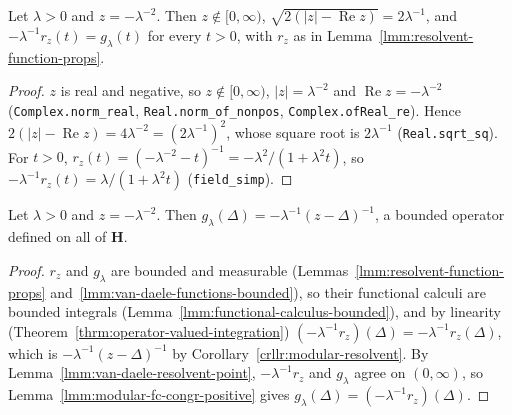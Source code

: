\begin{lemma}[Takesaki's Lemma at $z = -\lambda^{-2}$: Scalars]
    \label{lmm:van-daele-resolvent-point}
    \leanok
    Let $\lambda > 0$ and $z = -\lambda^{-2}$. Then $z \notin [0, \infty)$, $\sqrt{2(|z| - \operatorname{Re} z)} = 2\lambda^{-1}$, and $-\lambda^{-1}r_z(t) = g_\lambda(t)$ for every $t > 0$, with $r_z$ as in Lemma~\ref{lmm:resolvent-function-props}.
\end{lemma}
\begin{proof}
    \leanok
    $z$ is real and negative, so $z \notin [0, \infty)$, $|z| = \lambda^{-2}$ and $\operatorname{Re} z = -\lambda^{-2}$ (\texttt{Complex.norm\_real}, \texttt{Real.norm\_of\_nonpos}, \texttt{Complex.ofReal\_re}). Hence $2(|z| - \operatorname{Re} z) = 4\lambda^{-2} = (2\lambda^{-1})^2$, whose square root is $2\lambda^{-1}$ (\texttt{Real.sqrt\_sq}). For $t > 0$, $r_z(t) = (-\lambda^{-2} - t)^{-1} = -\lambda^2/(1 + \lambda^2t)$, so $-\lambda^{-1}r_z(t) = \lambda/(1 + \lambda^2 t)$ (\texttt{field\_simp}).
\end{proof}

\begin{lemma}
    \label{lmm:van-daele-g-resolvent}
    \leanok
    Let $\lambda > 0$ and $z = -\lambda^{-2}$. Then $g_\lambda(\Delta) = -\lambda^{-1}(z - \Delta)^{-1}$, a bounded operator defined on all of $\mathbf{H}$.
\end{lemma}
\begin{proof}
    \leanok
    $r_z$ and $g_\lambda$ are bounded and measurable (Lemmas~\ref{lmm:resolvent-function-props} and~\ref{lmm:van-daele-functions-bounded}), so their functional calculi are bounded integrals (Lemma~\ref{lmm:functional-calculus-bounded}), and by linearity (Theorem~\ref{thrm:operator-valued-integration}) $(-\lambda^{-1}r_z)(\Delta) = -\lambda^{-1}r_z(\Delta)$, which is $-\lambda^{-1}(z - \Delta)^{-1}$ by Corollary~\ref{crllr:modular-resolvent}. By Lemma~\ref{lmm:van-daele-resolvent-point}, $-\lambda^{-1}r_z$ and $g_\lambda$ agree on $(0, \infty)$, so Lemma~\ref{lmm:modular-fc-congr-positive} gives $g_\lambda(\Delta) = (-\lambda^{-1}r_z)(\Delta)$.
\end{proof}

